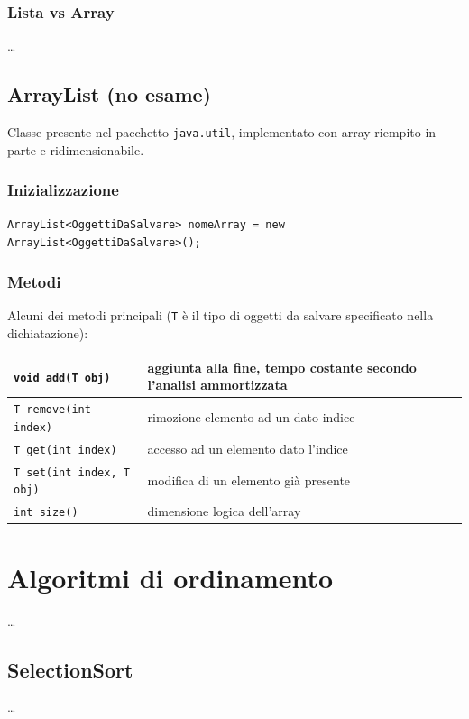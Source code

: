 \documentclass{article}
\begin{document}
\subsubsection*{Lista vs Array}
\dots

\subsection{ArrayList (no esame)}
Classe presente nel pacchetto \verb|java.util|, implementato con array riempito in parte e ridimensionabile.

\subsubsection*{Inizializzazione}
\verb|ArrayList<OggettiDaSalvare> nomeArray = new ArrayList<OggettiDaSalvare>();|

\subsubsection*{Metodi}
Alcuni dei metodi principali (\verb|T| è il tipo di oggetti da salvare specificato nella dichiatazione):

\begin{center}
	\begin{tabularx}{\textwidth}{l X}
		\toprule
		\verb|void add(T obj)| & aggiunta alla fine, tempo costante secondo l'analisi ammortizzata \\
		\midrule
		\verb|T remove(int index)| & rimozione elemento ad un dato indice \\
		\midrule
		\verb|T get(int index)| & accesso ad un elemento dato l'indice \\
		\midrule
		\verb|T set(int index, T obj)| & modifica di un elemento già presente \\
		\midrule
		\verb|int size()| & dimensione logica dell'array \\
		\bottomrule
	\end{tabularx}
\end{center}

\newpage


\section{Algoritmi di ordinamento}
\dots

\subsection{SelectionSort}
\dots
\end{document}

